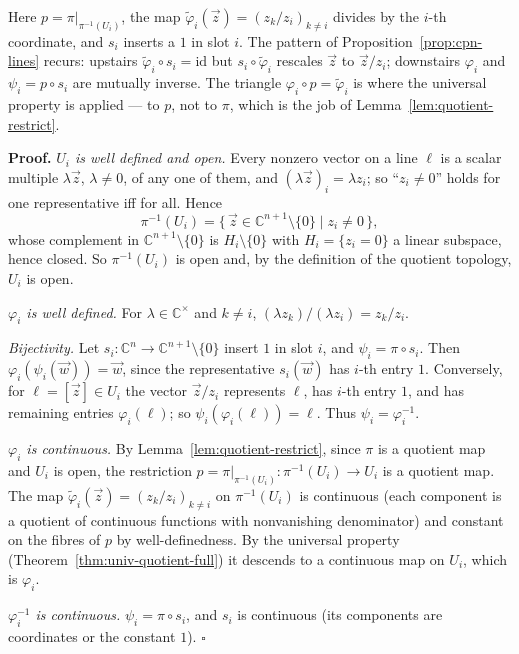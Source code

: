 \documentclass[11pt]{report}
\renewenvironment{proof}[1][Proof]{\noindent\textbf{#1.} }{\hfill$\square$\par\vspace{5pt}}
\begin{document}
Here $p = \pi|_{\pi^{-1}(U_i)}$, the map $\tilde\varphi_i(\vec z) = (z_k/z_i)_{k\neq i}$ divides by the $i$-th coordinate, and $s_i$ inserts a $1$ in slot $i$. The pattern of Proposition~\ref{prop:cpn-lines} recurs: upstairs $\tilde\varphi_i \circ s_i = \mathrm{id}$ but $s_i \circ \tilde\varphi_i$ rescales $\vec z$ to $\vec z/z_i$; downstairs $\varphi_i$ and $\psi_i = p \circ s_i$ are mutually inverse. The triangle $\varphi_i \circ p = \tilde\varphi_i$ is where the universal property is applied --- to $p$, not to $\pi$, which is the job of Lemma~\ref{lem:quotient-restrict}.


\begin{proof}
\emph{$U_i$ is well defined and open.} Every nonzero vector on a line $\ell$ is a scalar multiple $\lambda\vec z$, $\lambda \neq 0$, of any one of them, and $(\lambda\vec z)_i = \lambda z_i$; so ``$z_i \neq 0$'' holds for one representative iff for all. Hence
\[
\pi^{-1}(U_i) = \{\, \vec z \in \mathbb{C}^{n+1}\setminus\{0\} \mid z_i \neq 0 \,\},
\]
whose complement in $\mathbb{C}^{n+1}\setminus\{0\}$ is $H_i \setminus \{0\}$ with $H_i = \{z_i = 0\}$ a linear subspace, hence closed. So $\pi^{-1}(U_i)$ is open and, by the definition of the quotient topology, $U_i$ is open.

\emph{$\varphi_i$ is well defined.} For $\lambda \in \mathbb{C}^\times$ and $k \neq i$, $(\lambda z_k)/(\lambda z_i) = z_k/z_i$.

\emph{Bijectivity.} Let $s_i : \mathbb{C}^n \to \mathbb{C}^{n+1}\setminus\{0\}$ insert $1$ in slot $i$, and $\psi_i = \pi \circ s_i$. Then $\varphi_i(\psi_i(\vec w)) = \vec w$, since the representative $s_i(\vec w)$ has $i$-th entry $1$. Conversely, for $\ell = [\vec z] \in U_i$ the vector $\vec z/z_i$ represents $\ell$, has $i$-th entry $1$, and has remaining entries $\varphi_i(\ell)$; so $\psi_i(\varphi_i(\ell)) = \ell$. Thus $\psi_i = \varphi_i^{-1}$.

\emph{$\varphi_i$ is continuous.} By Lemma~\ref{lem:quotient-restrict}, since $\pi$ is a quotient map and $U_i$ is open, the restriction $p = \pi|_{\pi^{-1}(U_i)} : \pi^{-1}(U_i) \to U_i$ is a quotient map. The map $\tilde\varphi_i(\vec z) = (z_k/z_i)_{k\neq i}$ on $\pi^{-1}(U_i)$ is continuous (each component is a quotient of continuous functions with nonvanishing denominator) and constant on the fibres of $p$ by well-definedness. By the universal property (Theorem~\ref{thm:univ-quotient-full}) it descends to a continuous map on $U_i$, which is $\varphi_i$.

\emph{$\varphi_i^{-1}$ is continuous.} $\psi_i = \pi \circ s_i$, and $s_i$ is continuous (its components are coordinates or the constant $1$).
\end{proof}
\end{document}
